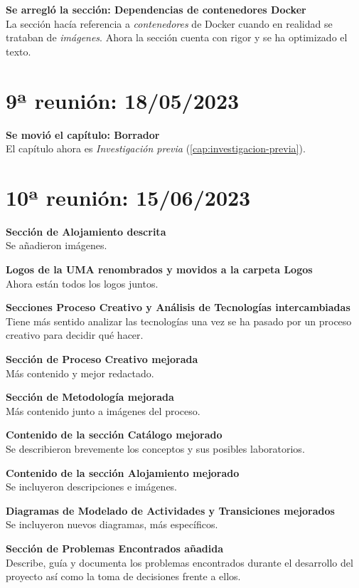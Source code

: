         \textbf{Se arregló la sección: Dependencias de contenedores Docker} \\
        La sección hacía referencia a \textit{contenedores} de Docker cuando en realidad se trataban de \textit{imágenes}. Ahora la sección cuenta con rigor y se ha optimizado el texto.

        \newpage

    \section{9ª reunión: 18/05/2023}

        \textbf{Se movió el capítulo: Borrador} \\
        El capítulo ahora es \textit{Investigación previa} (\ref{cap:investigacion-previa}).

        \newpage


    \section{10ª reunión: 15/06/2023}

        \textbf{Sección de Alojamiento descrita} \\
        Se añadieron imágenes.

        \textbf{Logos de la UMA renombrados y movidos a la carpeta Logos} \\
        Ahora están todos los logos juntos.

        \textbf{Secciones Proceso Creativo y Análisis de Tecnologías intercambiadas} \\
        Tiene más sentido analizar las tecnologías una vez se ha pasado por un proceso creativo para decidir qué hacer.

        \textbf{Sección de Proceso Creativo mejorada} \\
        Más contenido y mejor redactado.

        \textbf{Sección de Metodología mejorada} \\
        Más contenido junto a imágenes del proceso.

        \textbf{Contenido de la sección Catálogo mejorado} \\
        Se describieron brevemente los conceptos y sus posibles laboratorios.

        \textbf{Contenido de la sección Alojamiento mejorado} \\
        Se incluyeron descripciones e imágenes.

        \textbf{Diagramas de Modelado de Actividades y Transiciones mejorados} \\
        Se incluyeron nuevos diagramas, más específicos.

        \textbf{Sección de Problemas Encontrados añadida} \\
        Describe, guía y documenta los problemas encontrados durante el desarrollo del proyecto así como la toma de decisiones frente a ellos.